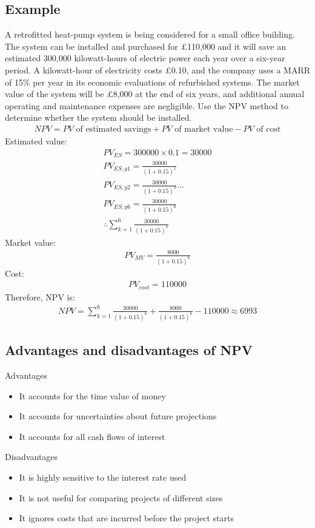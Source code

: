 \subsection{Example}
A retrofitted heat-pump system is being considered for a small office building. The system can be installed and purchased for \pounds 110,000 and it will save an estimated 300,000 kilowatt-hours of electric power each year over a six-year period. A kilowatt-hour of electricity costs \pounds 0.10, and the company uses a MARR of 15\% per year in its economic evaluations of refurbished systems. The market value of the system will be \pounds 8,000 at the end of six years, and additional annual operating and maintenance expenses are negligible. Use the NPV method to determine whether the system should be installed.
\begin{gather}
  NPV = PV\textrm{ of estimated savings} + PV\textrm{ of market value} -PV\textrm{ of cost}
\end{gather}
Estimated value:
\begin{gather}
  PV_{ES} = 300000\times 0.1 = 30000\\
  PV_{ES,y1} = \frac{30000}{(1+0.15)^1}\\
  PV_{ES,y2} = \frac{30000}{(1+0.15)^2}\dots\\
  PV_{ES,y6} = \frac{30000}{(1+0.15)^6} \\
  \therefore\sum_{k=1}^6\frac{30000}{(1+0.15)^k}
\end{gather}
Market value:
\begin{gather}
  PV_{MV} = \frac{8000}{(1+0.15)^6}
\end{gather}
Cost:
\begin{gather}
  PV_{cost} = 110000
\end{gather}
Therefore, NPV is:
\begin{gather}
  NPV = \sum_{k=1}^6\frac{30000}{(1+0.15)^k} +\frac{8000}{(1+0.15)^6} - 110000 \approx 6993
\end{gather}
\subsection{Advantages and disadvantages of NPV}
Advantages
\begin{itemize}
  \item It accounts for the time value of money
  \item It accounts for uncertainties about future projections
  \item It accounts for all cash flows of interest
\end{itemize}
Disadvantages
\begin{itemize}
  \item It is highly sensitive to the interest rate used
  \item It is not useful for comparing projects of different sizes
  \item It ignores costs that are incurred before the project starts
\end{itemize}
